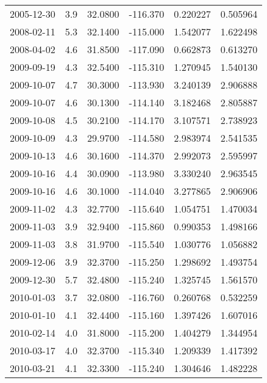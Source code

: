 \begin{tabular}{lrrrrr}
2005-12-30 &       3.9 &  32.0800 &  -116.370 &         0.220227 &         0.505964 \\
2008-02-11 &       5.3 &  32.1400 &  -115.000 &         1.542077 &         1.622498 \\
2008-04-02 &       4.6 &  31.8500 &  -117.090 &         0.662873 &         0.613270 \\
2009-09-19 &       4.3 &  32.5400 &  -115.310 &         1.270945 &         1.540130 \\
2009-10-07 &       4.7 &  30.3000 &  -113.930 &         3.240139 &         2.906888 \\
2009-10-07 &       4.6 &  30.1300 &  -114.140 &         3.182468 &         2.805887 \\
2009-10-08 &       4.5 &  30.2100 &  -114.170 &         3.107571 &         2.738923 \\
2009-10-09 &       4.3 &  29.9700 &  -114.580 &         2.983974 &         2.541535 \\
2009-10-13 &       4.6 &  30.1600 &  -114.370 &         2.992073 &         2.595997 \\
2009-10-16 &       4.4 &  30.0900 &  -113.980 &         3.330240 &         2.963545 \\
2009-10-16 &       4.6 &  30.1000 &  -114.040 &         3.277865 &         2.906906 \\
2009-11-02 &       4.3 &  32.7700 &  -115.640 &         1.054751 &         1.470034 \\
2009-11-03 &       3.9 &  32.9400 &  -115.860 &         0.990353 &         1.498166 \\
2009-11-03 &       3.8 &  31.9700 &  -115.540 &         1.030776 &         1.056882 \\
2009-12-06 &       3.9 &  32.3700 &  -115.250 &         1.298692 &         1.493754 \\
2009-12-30 &       5.7 &  32.4800 &  -115.240 &         1.325745 &         1.561570 \\
2010-01-03 &       3.7 &  32.0800 &  -116.760 &         0.260768 &         0.532259 \\
2010-01-10 &       4.1 &  32.4400 &  -115.160 &         1.397426 &         1.607016 \\
2010-02-14 &       4.0 &  31.8000 &  -115.200 &         1.404279 &         1.344954 \\
2010-03-17 &       4.0 &  32.3700 &  -115.340 &         1.209339 &         1.417392 \\
2010-03-21 &       4.1 &  32.3300 &  -115.240 &         1.304646 &         1.482228 \\

\end{tabular}
